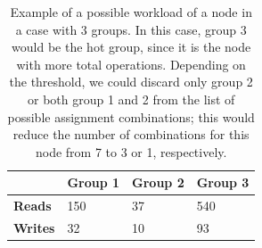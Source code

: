 \begin{table}[!htb]
  \centering
  \begin{tabular}{l l l l}
    \hline
    & \textbf{Group 1} & \textbf{Group 2} & \textbf{Group 3} \\
    \hline
    \textbf{Reads} & 150 & 37 & 540 \\
    \textbf{Writes} & 32 & 10 & 93 \\
    \hline
  \end{tabular}

  \caption{Example of a possible workload of a node in a case with 3 groups. In this case, group 3 would be the hot group, since it is the node with more total operations. Depending on the threshold, we could discard only group 2 or both group 1 and 2 from the list of possible assignment combinations; this would reduce the number of combinations for this node from 7 to 3 or 1, respectively.}\label{tab:hot-groups-example}
\end{table}


